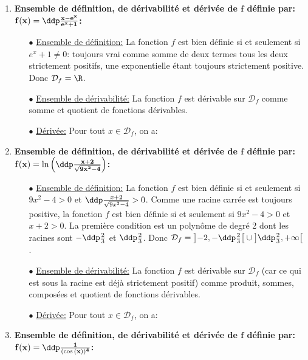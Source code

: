 \begin{correction}
\begin{enumerate}
\item  \textbf{Ensemble de d\'efinition, de d\'erivabilit\'e et d\'eriv\'ee de $\mathbf{f}$ d\'efinie par: $\mathbf{f(x)=\ddp\frac{x-e^x}{e^x+1}}$:}
\begin{itemize}
\item[$\bullet$] \underline{Ensemble de d\'efinition:} La fonction $f$ est bien d\'efinie si et seulement si $e^x+1\not= 0$: toujours vrai comme somme de deux termes tous les deux strictement positifs, une exponentielle \'etant toujours strictement positive. Donc $\mathcal{D}_f=\R$.
\item[$\bullet$] \underline{Ensemble de d\'erivabilit\'e:} La fonction $f$ est d\'erivable sur $\mathcal{D}_f$ comme somme et quotient de fonctions d\'erivables.
\item[$\bullet$] \underline{D\'eriv\'ee:} Pour tout $x\in\mathcal{D}_f$, on a: 
 \end{itemize}
\item  \textbf{Ensemble de d\'efinition, de d\'erivabilit\'e et d\'eriv\'ee de $\mathbf{f}$ d\'efinie par: $\mathbf{f(x)=\ln{\left(  \ddp\frac{x+2}{\sqrt{9x^2-4}} \right)}}$:}
\begin{itemize}
\item[$\bullet$] \underline{Ensemble de d\'efinition:} La fonction $f$ est bien d\'efinie si et seulement si $9x^2-4>0$ et $ \ddp\frac{x+2}{\sqrt{9x^2-4}} >0$. Comme une racine carr\'ee est toujours positive, la fonction $f$ est bien d\'efinie si et seulement si $9x^2-4>0$ et $x+2>0$. La première condition est un polyn\^{o}me de degr\'e 2 dont les racines sont $-\ddp\frac{2}{3}$ et $\ddp\frac{2}{3}$. Donc $\mathcal{D}_f=\left\rbrack -2,-\ddp\frac{2}{3}\right\lbrack\cup\left\rbrack \ddp\frac{2}{3},+\infty\right\lbrack$.
\item[$\bullet$] \underline{Ensemble de d\'erivabilit\'e:} La fonction $f$ est d\'erivable sur $\mathcal{D}_f$ (car ce qui est sous la racine est d\'ej\`{a} strictement positif) comme produit, sommes, compos\'ees et quotient de fonctions d\'erivables.
\item[$\bullet$] \underline{D\'eriv\'ee:} Pour tout $x\in\mathcal{D}_f$, on a: 
 \end{itemize}
\item  \textbf{Ensemble de d\'efinition, de d\'erivabilit\'e et d\'eriv\'ee de $\mathbf{f}$ d\'efinie par: $\mathbf{f(x)=\ddp\frac{1}{(\cos{(x)})^4}}$:}

\end{enumerate}
\end{correction}
